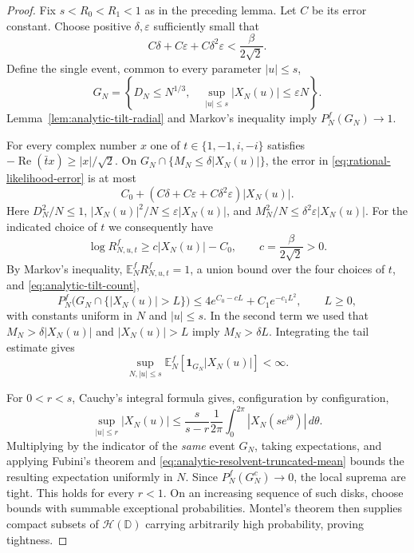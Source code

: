 \documentclass[11pt,a4paper]{article}
\numberwithin{equation}{section}
\theoremstyle{definition}
\theoremstyle{remark}
\newcommand{\D}{\mathbb D}
\begin{document}
\begin{proof}
Fix $s<R_0<R_1<1$ as in the preceding lemma. Let $C$ be its error
constant. Choose positive $\delta,\varepsilon$ sufficiently small that
\[
 C\delta+C\varepsilon+C\delta^2\varepsilon
       <\frac{\beta}{2\sqrt2}.
\]
Define the single event, common to every parameter $|u|\leq s$,
\[
 G_N=\left\{D_N\leq N^{1/3},\quad
           \sup_{|u|\leq s}|X_N(u)|\leq\varepsilon N\right\}.
\]
Lemma~\ref{lem:analytic-tilt-radial} and Markov's inequality imply
$P_N^f(G_N)\to1$.

For every complex number $x$ one of $t\in\{1,-1,i,-i\}$ satisfies
$-\operatorname{Re}(\bar t x)\geq|x|/\sqrt2$. On
$G_N\cap\{M_N\leq\delta|X_N(u)|\}$, the error in
\eqref{eq:rational-likelihood-error} is at most
\[
 C_0+(C\delta+C\varepsilon+C\delta^2\varepsilon)|X_N(u)|.
\]
Here $D_N^2/N\leq1$, $|X_N(u)|^2/N\leq\varepsilon|X_N(u)|$, and
$M_N^2/N\leq\delta^2\varepsilon|X_N(u)|$. For the indicated choice of
$t$ we consequently have
\[
 \log R_{N,u,t}^f\geq c|X_N(u)|-C_0,
 \qquad c=\frac{\beta}{2\sqrt2}>0.
\]
By Markov's inequality, $\mathbb E_N^fR_{N,u,t}^f=1$, a union bound over
the four choices of $t$, and \eqref{eq:analytic-tilt-count},
\begin{equation}\label{eq:analytic-resolvent-good-tail}
 P_N^f\bigl(G_N\cap\{|X_N(u)|>L\}\bigr)
 \leq 4e^{C_0-cL}+C_1e^{-c_1L^2},\qquad L\geq0,
\end{equation}
with constants uniform in $N$ and $|u|\leq s$. In the second term we
used that $M_N>\delta|X_N(u)|$ and $|X_N(u)|>L$ imply
$M_N>\delta L$. Integrating the tail estimate gives
\begin{equation}\label{eq:analytic-resolvent-truncated-mean}
 \sup_{N,|u|\leq s}\mathbb E_N^f[\mathbf1_{G_N}|X_N(u)|]<\infty.
\end{equation}

For $0<r<s$, Cauchy's integral formula gives, configuration by
configuration,
\[
 \sup_{|u|\leq r}|X_N(u)|
 \leq\frac{s}{s-r}\frac1{2\pi}
        \int_0^{2\pi}|X_N(se^{i\theta})|\,d\theta.
\]
Multiplying by the indicator of the \emph{same} event $G_N$, taking
expectations, and applying Fubini's theorem and
\eqref{eq:analytic-resolvent-truncated-mean} bounds the resulting
expectation uniformly in $N$. Since $P_N^f(G_N^c)\to0$, the local suprema
are tight. This holds for every $r<1$. On an increasing sequence of such
disks, choose bounds with summable exceptional probabilities. Montel's
theorem then supplies compact subsets of $\mathcal H(\D)$ carrying
arbitrarily high probability, proving tightness.
\end{proof}
\end{document}
